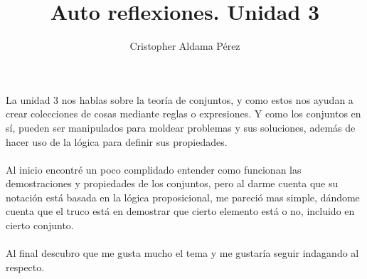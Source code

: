 \documentclass[a4paper,10pt]{article}
\title{Auto reflexiones. Unidad 3}
\author{Cristopher Aldama Pérez}
\begin{document}
\maketitle

La unidad 3 nos hablas sobre la teoría de conjuntos, y como estos nos ayudan a crear colecciones de cosas mediante reglas o expresiones. Y como los conjuntos en sí, pueden ser manipulados para moldear problemas y sus soluciones, además de hacer uso de la lógica para definir sus propiedades.
\\
\\Al inicio encontré un poco complidado entender como funcionan las demostraciones y propiedades de los conjuntos, pero al darme cuenta que su notación está basada en la lógica proposicional, me pareció mas simple, dándome cuenta que el truco está en demostrar que cierto elemento está o no, incluido en cierto conjunto.
\\
\\Al final descubro que me gusta mucho el tema y me gustaría seguir indagando al respecto.
\end{document}

